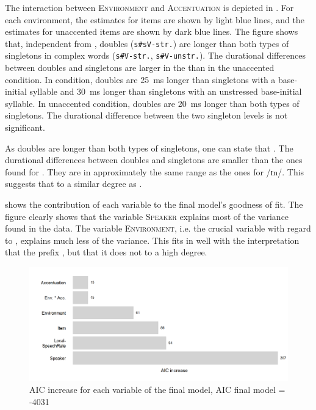 The interaction between \textsc{Environment} and \textsc{Accentuation} is depicted in . For each environment, the estimates for  items are shown by light blue lines, and the estimates for unaccented items are shown by dark blue lines.
The figure shows that,  
independent from , doubles (\texttt{s\#sV-str.}) are longer than both types of singletons in complex words (\texttt{s\#V-str.}, \texttt{s\#V-unstr.}). The durational differences between doubles and singletons are larger in the  than in the unaccented condition. 
In  condition, doubles are 25~ms longer than singletons with a  base-initial syllable and 30~ms longer than singletons with an unstressed base-initial syllable. 
In unaccented condition, doubles are 20~ms longer than both types of singletons. 
The durational difference between the two singleton levels is not significant.

As doubles are longer than both types of singletons, one can state that  . The durational differences between doubles and singletons are smaller than the ones found for . They are in approximately the same range as the ones for /ɪn/. This suggests that   to a similar degree as .



 shows the contribution of each variable to the final model's goodness of fit.
The figure clearly shows that the variable \textsc{Speaker} explains most of the variance found in the data. The variable 
\textsc{Environment}, i.e. the crucial variable with regard to , explains much less of the variance. This fits in well with the interpretation that the prefix  , but that it does not  to a high degree.


\begin{figure}
	
	\includegraphics[scale=0.7]{images/Experiment/AICdecreaseDisComplex.png}
	\caption{AIC increase for each variable of the final model, AIC final model = -4031}
	\label{fig:Effectsize dis experiment}

\end{figure}



